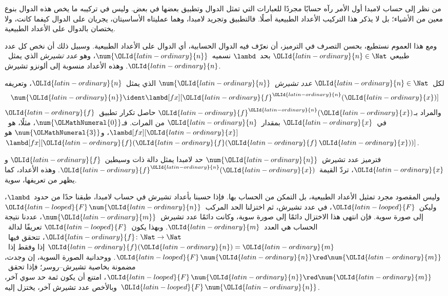 \documentclass[../../../include/open-logic-section]{subfiles}
\begin{document}

من نظر إلى حساب لامبدا أول الأمر رآه حسابًا مجردًا للعبارات التي تمثل
الدوال وتطبيق بعضها في بعض. وليس في تركيبه ما يخص هذه الدوال بنوع
معين من الأشياء؛ بل لا يذكر هذا التركيب الأعداد الطبيعية أصلًا.
فالتطبيق وتجريد لامبدا، وهما عمليتاه الأساسيتان، يجريان على الدوال
كيفما كانت، ولا يختصان بالدوال على الأعداد الطبيعية.

ومع هذا العموم نستطيع، بحسن التصرف في الترميز، أن نعرّف فيه الدوال
الحسابية، أي الدوال على الأعداد الطبيعية. وسبيل ذلك أن نخص كل عدد طبيعي
${\OLId{latin-ordinary}{n}} \in \Nat$ بحد~$\lambd$ نسميه~$\num {\OLId{latin-ordinary}{n}}$، وهو \emph{عدد تشيرش}
الذي يمثل~${\OLId{latin-ordinary}{n}}$. وهذه الأعداد منسوبة إلى ألونزو تشيرش.

\begin{defn}
  لكل~${\OLId{latin-ordinary}{n}} \in \Nat$ \emph{عدد تشيرش}~$\num{{\OLId{latin-ordinary}{n}}}$ الذي يمثل~${\OLId{latin-ordinary}{n}}$،
  وتعريفه
  \[
    \num{{\OLId{latin-ordinary}{n}}} \ident \lambd[fx][{\OLId{latin-ordinary}{f}}^{\OLId{latin-ordinary}{n}}({\OLId{latin-ordinary}{x}})]
  \]
  والمراد بـ${\OLId{latin-ordinary}{f}}^{\OLId{latin-ordinary}{n}}({\OLId{latin-ordinary}{x}})$ حاصل تكرار تطبيق~${\OLId{latin-ordinary}{f}}$ في~${\OLId{latin-ordinary}{x}}$ بمقدار~${\OLId{latin-ordinary}{n}}$ من المرات.
  فـ$\num{{\OLMathNumeral{0}}}$، مثلًا، هو~$\lambd[fx][{\OLId{latin-ordinary}{x}}]$، و$\num{{\OLMathNumeral{3}}}$
  هو~$\lambd[fx][{\OLId{latin-ordinary}{f}}({\OLId{latin-ordinary}{f}}({\OLId{latin-ordinary}{f}}\,{\OLId{latin-ordinary}{x}}))]$.
\end{defn}
  
فترميز عدد تشيرش~$\num {\OLId{latin-ordinary}{n}}$ حد لامبدا يمثل دالة ذات وسيطين~${\OLId{latin-ordinary}{f}}$ و${\OLId{latin-ordinary}{x}}$،
تردّ القيمة~${\OLId{latin-ordinary}{f}}^{\OLId{latin-ordinary}{n}}({\OLId{latin-ordinary}{x}})$. وهذه الأعداد، كما يظهر من تعريفها، سوية.

وليس المقصود مجرد تمثيل الأعداد الطبيعية، بل التمكن من الحساب بها.
فإذا حسبنا بأعداد تشيرش في حساب لامبدا، طبقنا حدًا من حدود~$\lambd$،
وليكن~${\OLId{latin-looped}{F}}$، في عدد تشيرش، ثم اختزلنا الحد المركب~${\OLId{latin-looped}{F}}\, \num {\OLId{latin-ordinary}{n}}$ إلى صورة سوية.
فإن انتهى هذا الاختزال دائمًا إلى صورة سوية، وكانت دائمًا عدد تشيرش~$\num {\OLId{latin-ordinary}{m}}$،
عددنا نتيجة الحساب هي العدد~${\OLId{latin-ordinary}{m}}$.
وبهذا يكون~${\OLId{latin-looped}{F}}$ تعريفًا لدالة~${\OLId{latin-ordinary}{f}}\colon \Nat \to \Nat$،
تتحقق فيها~${\OLId{latin-ordinary}{f}}({\OLId{latin-ordinary}{n}}) = {\OLId{latin-ordinary}{m}}$ إذا وفقط إذا~${\OLId{latin-looped}{F}}\, \num {\OLId{latin-ordinary}{n}} \red \num {\OLId{latin-ordinary}{m}}$.
ووحدانية الصورة السوية، إن وجدت، مضمونة بخاصية تشيرش--روسر؛
فإذا تحقق~${\OLId{latin-looped}{F}}\, \num {\OLId{latin-ordinary}{n}} \red \num {\OLId{latin-ordinary}{m}}$، امتنع أن يكون ثمة حد سوي آخر،
وبالأخص عدد تشيرش آخر، يختزل إليه~${\OLId{latin-looped}{F}} \, \num {\OLId{latin-ordinary}{n}}$.
\end{document}
